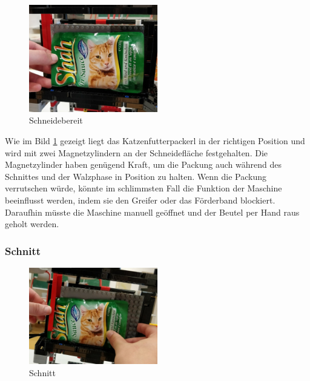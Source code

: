 \begin{figure}
\vspace{-30pt}
  \begin{center}
    \includegraphics[width=0.50\textwidth]{Bilder/Ablauf_1_png/Schneidebereit}
  \end{center}
  \caption{Schneidebereit}
  \label{Schneidebereit}
  \vspace{-10pt}
\end{figure}

Wie im Bild \ref{Schneidebereit} gezeigt liegt das Katzenfutterpackerl in der richtigen Position und wird mit zwei Magnetzylindern an der Schneidefläche festgehalten. Die Magnetzylinder haben genügend Kraft, um die Packung auch während des Schnittes und der Walzphase in Position zu halten. Wenn die Packung verrutschen würde, könnte im schlimmsten Fall die Funktion der Maschine beeinflusst werden, indem sie den Greifer oder das Förderband blockiert. Daraufhin müsste die Maschine manuell geöffnet und der Beutel per Hand raus geholt werden. \newpage
\subsubsection{Schnitt}

\begin{figure}
\vspace{-30pt}
  \begin{center}
    \includegraphics[width=0.50\textwidth]{Bilder/Ablauf_1_png/Schnitt}
  \end{center}
  \caption{Schnitt}
  \label{Schnitt}
  \vspace{-10pt}
\end{figure}

